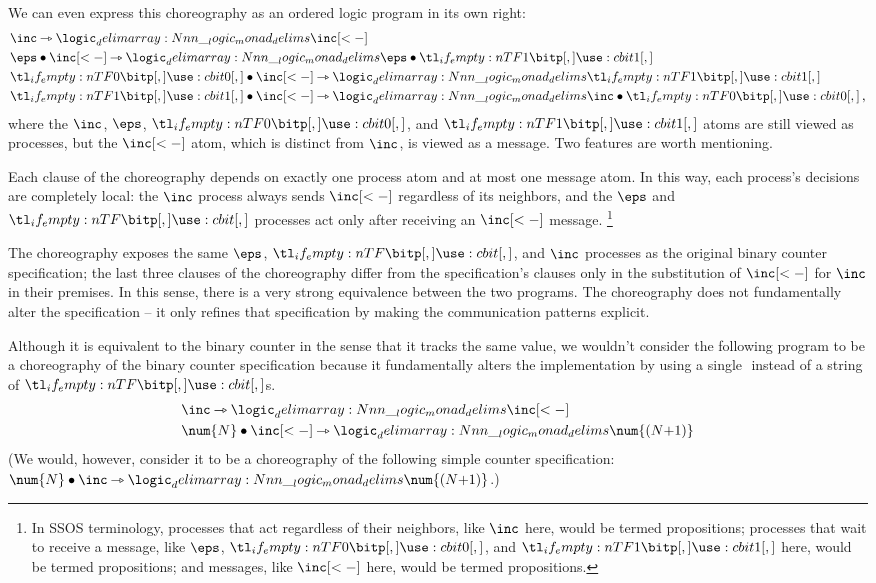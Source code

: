 We can even express this choreography as an ordered logic program in its own right:
\begin{align*}
  &\inc \lrimp \monad{\inc[<-]} \\
  &\eps \fuse \inc[<-] \lrimp \monad{\eps \fuse \bit{1}} \\
  &\bit{0} \fuse \inc[<-] \lrimp \monad{\bit{1}} \\
  &\bit{1} \fuse \inc[<-] \lrimp \monad{\inc \fuse \bit{0}} \text{\,,}
\end{align*}
where the $\inc$, $\eps$, $\bit{0}$, and $\bit{1}$ atoms are still viewed as processes, but the $\inc[<-]$ atom, which is distinct from $\inc$, is viewed as a message.
%
Two features are worth mentioning.
\begin{description}[font=\normalfont\itshape, leftmargin=\parindent, labelindent=\leftmargin]
\item[Local decisions.]
Each clause of the choreography depends on exactly one process atom and at most one message atom.
In this way, each process's decisions are completely local: the $\inc$ process always sends $\inc[<-]$ regardless of its neighbors, and the $\eps$ and $\bit{}$ processes act only after receiving an $\inc[<-]$ message.%
\footnote{In \ac{SSOS} terminology, processes that act regardless of their neighbors, like $\inc$ here, would be termed  propositions; processes that wait to receive a message, like $\eps$, $\bit{0}$, and $\bit{1}$ here, would be termed  propositions; and messages, like $\inc[<-]$ here, would be termed  propositions.}
%
\item[Preserves implementation.]
The choreography exposes the same $\eps$, $\bit{}$, and $\inc$ processes as the original binary counter specification; the last three clauses of the choreography differ from the specification's clauses only in the substitution of $\inc[<-]$ for $\inc$ in their premises.
In this sense, there is a very strong equivalence between the two programs.
The choreography does not fundamentally alter the specification -- it only refines that specification by making the communication patterns explicit.

%
Although it is equivalent to the binary counter in the sense that it tracks the same value, we wouldn't consider the following program to be a choreography of the binary counter specification because it fundamentally alters the implementation by using a single $\num{}$ instead of a string of $\bit{}$s.
\begin{align*}
  &\inc \lrimp \monad{\inc[<-]} \\
  &\num{N} \fuse \inc[<-] \lrimp \monad{\num{(N{+}1)}}
\end{align*}
(We would, however, consider it to be a choreography of the following simple counter specification: $\num{N} \fuse \inc \lrimp \monad{\num{(N{+}1)}}$.)
\end{description}

